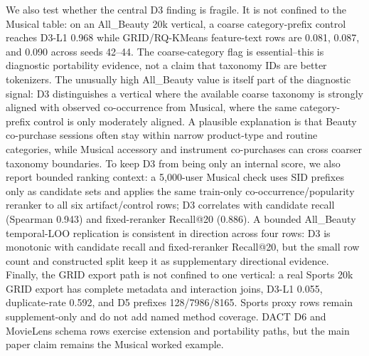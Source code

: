We also test whether the central D3 finding is fragile. It is not confined to
the Musical table: on an All\_Beauty 20k vertical, a
coarse category-prefix control reaches D3-L1 0.968 while GRID/RQ-KMeans
feature-text rows are 0.081, 0.087, and 0.090 across seeds 42--44. The
coarse-category flag is essential--this is diagnostic portability evidence, not
a claim that taxonomy IDs are better tokenizers. The unusually high
All\_Beauty value is itself part of the diagnostic signal: D3 distinguishes a
vertical where the available coarse taxonomy is strongly aligned with observed
co-occurrence from Musical, where the same category-prefix control is only
moderately aligned. A plausible explanation is that Beauty co-purchase sessions
often stay within narrow product-type and routine categories, while Musical
accessory and instrument co-purchases can cross coarser taxonomy boundaries.
To keep D3 from being only an internal score, we also report bounded ranking
context: a 5,000-user Musical check uses SID prefixes only as candidate sets
and applies the same train-only co-occurrence/popularity reranker to all six
artifact/control rows; D3 correlates with candidate recall (Spearman 0.943) and
fixed-reranker Recall@20 (0.886). A bounded All\_Beauty temporal-LOO
replication is consistent in direction across four rows: D3 is monotonic with
candidate recall and fixed-reranker Recall@20, but the small row count and
constructed split keep it as supplementary directional evidence. Finally, the
GRID export path is not confined to one vertical: a real Sports 20k GRID export
has complete metadata and interaction joins, D3-L1 0.055, duplicate-\sid rate
0.592, and D5 prefixes 128/7986/8165. Sports proxy rows remain supplement-only
and do not add named method coverage. DACT D6 and MovieLens schema rows
exercise extension and portability paths, but the main paper claim remains the
Musical worked example.
